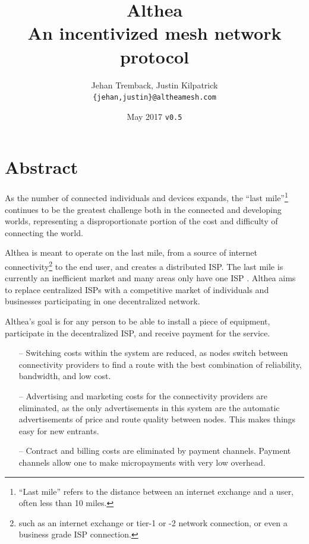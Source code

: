 \documentclass[11pt]{article}
\title{%
  \textbf{Althea} \\
	\vspace{3pt}
  \large An incentivized mesh network protocol}
\author{Jehan Tremback, Justin Kilpatrick\\
\texttt{\{jehan,justin\}@altheamesh.com}\\}
\date{May 2017 \texttt{v0.5}}
\newlength{\currentparskip}
\newenvironment{unbreakable}
  {\setlength{\currentparskip}{\parskip}%
	 \vspace{\currentparskip}
   \begin{minipage}{\textwidth}%
   \setlength{\parskip}{\currentparskip}%
  }
  {\end{minipage}\vspace{\currentparskip}}
\begin{document}
\maketitle

\begin{unbreakable}
\section*{Abstract}
\begin{small}
As the number of connected individuals and devices expands, the ``last mile''\footnote{``Last mile'' refers to the distance between an internet exchange and a user, often less than 10 miles.} continues to be the greatest challenge both in the connected and developing worlds, representing a disproportionate portion of the cost and difficulty of connecting the world.
 
Althea is meant to operate on the last mile, from a source of internet connectivity\footnote{such as an internet exchange or tier-1 or -2 network connection, or even a business grade ISP connection.} to the end user, and creates a distributed ISP. The last mile is currently an inefficient market and many areas only have one ISP \cite{fcc}. Althea aims to replace centralized ISPs with a competitive market of individuals and businesses participating in one decentralized network.

Althea’s goal is for any person to be able to install a piece of equipment, participate in the decentralized ISP, and receive payment for the service.

\begin{itemize}
\item[--] Switching costs within the system are reduced, as nodes switch between connectivity providers to find a route with the best combination of reliability, bandwidth, and low cost.
 
\item[--] Advertising and marketing costs for the connectivity providers are eliminated, as the only advertisements in this system are the automatic advertisements of price and route quality between nodes. This makes things easy for new entrants.
 
\item[--] Contract and billing costs are eliminated by payment channels. Payment channels allow one to make micropayments with very low overhead.
\end{itemize}
\end{small}
\end{unbreakable}
\end{document}
